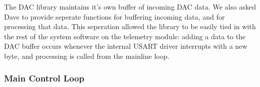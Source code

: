 The DAC library maintains it's own buffer of incoming DAC data. We also asked Dave to provide seperate functions for buffering incoming data, and for processing that data. This seperation allowed the library to be easily tied in with the rest of the system software on the telemetry module: adding a data to the DAC buffer occurs whenever the internal USART driver interrupts with a new byte, and processing is called from the mainline loop.

\subsubsection{Main Control Loop}